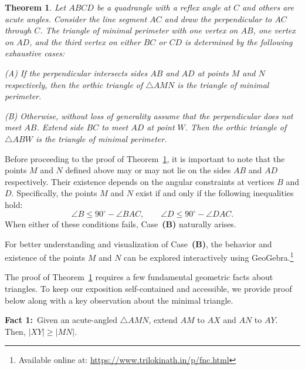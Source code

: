 \documentclass[12pt,a4paper]{article}
\newtheorem{theorem}{Theorem}[section]
\theoremstyle{definition}
\theoremstyle{remark}
\begin{document}
\begin{theorem}\label{maintheorem}
	Let $ABCD$ be a quadrangle with a reflex angle at $C$ and others are acute angles. Consider the line segment $AC$ and draw the perpendicular to $AC$ through $C$. The triangle of minimal perimeter with 	one vertex on $AB$, one vertex on $AD$, and the third 
	vertex on either $BC$ or $CD$ is determined by the 	following exhaustive cases:
	
	(A) If the perpendicular intersects sides $AB$ and $AD$ at points $M$ and $N$ respectively, then the 	orthic triangle of $\triangle AMN$ is the triangle 	of minimal perimeter.
	
	(B) Otherwise, without loss of generality assume that the perpendicular does not meet $AB$. Extend side $BC$ 	to meet $AD$ at point $W$. Then the orthic triangle	of $\triangle ABW$ is the triangle of minimal	perimeter.
\end{theorem}





Before proceeding to the proof of Theorem~\ref{maintheorem}, it is important to note that 
the points $M$ and $N$ defined above may or may not lie on the sides $AB$ and $AD$ 
respectively. Their existence depends on the angular constraints at vertices $B$ and $D$. 
Specifically, the points $M$ and $N$ exist if and only if the following inequalities hold:
\begin{equation}\label{existence}
	\angle B \leq 90^{\circ} - \angle BAC, 
	\qquad 
	\angle D \leq 90^{\circ} - \angle DAC.
\end{equation}
When either of these conditions fails, Case~\textbf{(B)} naturally arises.

For better understanding and visualization of Case~\textbf{(B)}, the behavior and existence 
of the points $M$ and $N$ can be explored interactively using GeoGebra.\footnote{Available 
	online at: \url{https://www.trilokinath.in/p/fnc.html}}




\medskip

The proof of Theorem~\ref{maintheorem} requires a few fundamental geometric facts about triangles. To keep our exposition self-contained and accessible, we provide proof below  along with a key observation about the minimal triangle.

\textbf{Fact 1:} Given an acute-angled $\triangle AMN$, extend $AM$ to $AX$ and $AN$ to $AY$. Then, $|XY| \geq |MN|$.
\end{document}
